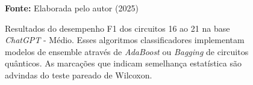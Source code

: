 \begin{figure}
\caption{Resultados do desempenho F1 dos circuitos 16 ao 21 na base \textit{ChatGPT} - Médio. Esses algoritmos classificadores implementam modelos de ensemble através de \textit{AdaBoost} ou \textit{Bagging} de circuitos quânticos. As marcações que indicam semelhança estatística são advindas do teste pareado de Wilcoxon.}
\label{fig:f1:medium:g6}
     \centering
    \centering

      \par\medskip\ABNTEXfontereduzida\selectfont\textbf{Fonte:} Elaborada pelo autor (2025) \par\medskip
\end{figure}